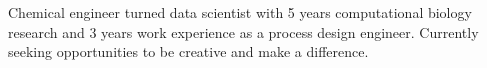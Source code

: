 

\begin{cvparagraph}


Chemical engineer turned data scientist with 5 years computational biology research and 3 years work experience as a process design engineer. Currently seeking opportunities to be creative and make a difference.

\vspace{-2.0mm}

\end{cvparagraph}
